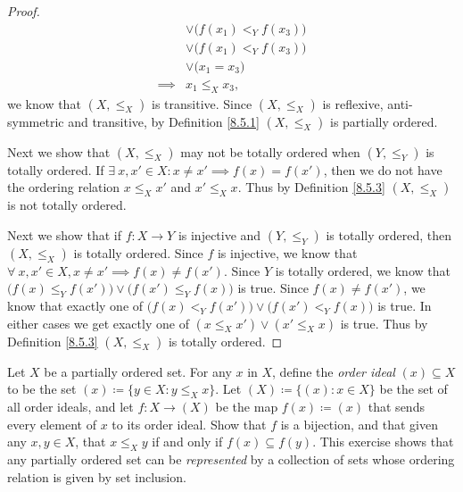 \begin{proof}
\begin{align*}
                 & \lor \big(f(x_1) <_Y f(x_3)\big)                                                                                                    \\
                 & \lor \big(f(x_1) <_Y f(x_3)\big)                                                                                                    \\
                 & \lor \big(x_1 = x_3\big)                                                                                                            \\
        \implies & x_1 \leq_X x_3,
    \end{align*}
    we know that \((X, \leq_X)\) is transitive.
    Since \((X, \leq_X)\) is reflexive, anti-symmetric and transitive, by Definition \ref{8.5.1} \((X, \leq_X)\) is partially ordered.

    Next we show that \((X, \leq_X)\) may not be totally ordered when \((Y, \leq_Y)\) is totally ordered.
    If \(\exists\ x, x' \in X : x \neq x' \implies f(x) = f(x')\), then we do not have the ordering relation \(x \leq_X x'\) and \(x' \leq_X x\).
    Thus by Definition \ref{8.5.3} \((X, \leq_X)\) is not totally ordered.

    Next we show that if \(f : X \to Y\) is injective and \((Y, \leq_Y)\) is totally ordered, then \((X, \leq_X)\) is totally ordered.
    Since \(f\) is injective, we know that \(\forall\ x, x' \in X, x \neq x' \implies f(x) \neq f(x')\).
    Since \(Y\) is totally ordered, we know that \(\big(f(x) \leq_Y f(x')\big) \lor \big(f(x') \leq_Y f(x)\big)\) is true.
    Since \(f(x) \neq f(x')\), we know that exactly one of \(\big(f(x) <_Y f(x')\big) \lor \big(f(x') <_Y f(x)\big)\) is true.
    In either cases we get exactly one of \((x \leq_X x') \lor (x' \leq_X x)\) is true.
    Thus by Definition \ref{8.5.3} \((X, \leq_X)\) is totally ordered.
\end{proof}

\begin{exercise}\label{ex 8.5.6}
    Let \(X\) be a partially ordered set.
    For any \(x\) in \(X\), define the \emph{order ideal} \((x) \subseteq X\) to be the set \((x) \coloneqq \{y \in X : y \leq_X x\}\).
    Let \((X) \coloneqq \{(x) : x \in X\}\) be the set of all order ideals, and let \(f : X \to (X)\) be the map \(f(x) \coloneqq (x)\) that sends every element of \(x\) to its order ideal.
    Show that \(f\) is a bijection, and that given any \(x, y \in X\), that \(x \leq_X y\) if and only if \(f(x) \subseteq f(y)\).
    This exercise shows that any partially ordered set can be \emph{represented} by a collection of sets whose ordering relation is given by set inclusion.
\end{exercise}

